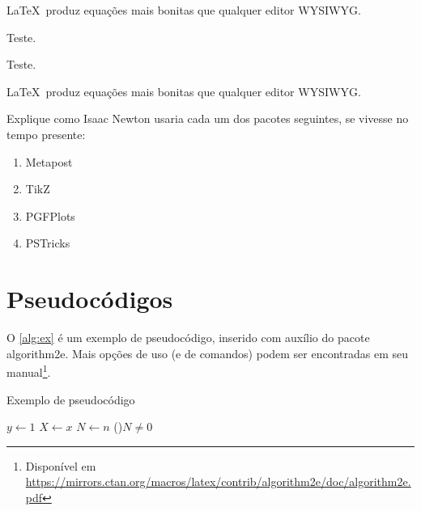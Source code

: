 \begin{proposition}\label{prop:WYSIWYG}
    \LaTeX\ produz equações mais bonitas que qualquer editor WYSIWYG.
\end{proposition}

\begin{lemma}
    Teste.
\end{lemma}

\begin{corollary}
    Teste.
\end{corollary}

\begin{remark}
    \LaTeX\ produz equações mais bonitas que qualquer editor WYSIWYG.
\end{remark}

\begin{exercise}\label{exc:in}
    Explique como Isaac Newton usaria cada um dos pacotes seguintes, se vivesse no tempo presente:
    \begin{enumerate}[label=(\alph*)]
        \item Metapost
        \item TikZ
        \item PGFPlots
        \item PSTricks
    \end{enumerate}
\end{exercise}


\section{Pseudocódigos}

O \cref{alg:ex} é um exemplo de pseudocódigo, inserido com auxílio do pacote \textsf{algorithm2e}. Mais opções de uso (e de comandos) podem ser encontradas em seu manual\footnote{Disponível em \url{https://mirrors.ctan.org/macros/latex/contrib/algorithm2e/doc/algorithm2e.pdf}}.

\begin{algorithm}[htb]
\caption{Exemplo de pseudocódigo}\label{alg:ex}
$y \gets 1$\;
$X \gets x$\;
$N \gets n$\;
\While(){$N \neq 0$}{
}
\end{algorithm}

